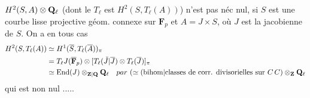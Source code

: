 $H^2(S,A)\otimes\mathbf{Q}_\ell$ (dont le $T_\ell$ est $H^2(S,T_\ell(A))$) n'est pas néc nul,   si $S$ est une courbe lisse projective géom. connexe sur $\mathbf{F}_p$ et $A=J\times S$, où $J$ est la jacobienne de $S$.
On a en tous cas
\[
\begin{aligned}
H^2(S,T_\ell(A))&\simeq H^1(\overline{S},T_\ell(\overline{A}))_\pi\\
&=\deleted{T_\ell J(\overline{\mathbf{F}}_p)\otimes}\inserted{[T_\ell(\unsure{\check{J}|\overline{J}})\otimes T_\ell(\overline{J})]_\pi}\\
&\simeq\mathrm{End}(J)\otimes_{\unsure{\mathbf{Z}|\mathbf{Q}}}\mathbf{Q}_\ell\quad\deleted{\unsure{par}}\ (\simeq(\unsure{\text{bihom}|\text{classes}}\text{ de corr. }\inserted{\text{divisorielles}}\text{ sur }C\,C)\otimes_{\mathbf{Z}}\mathbf{Q}_\ell
\end{aligned}
\]
qui est non nul .....
